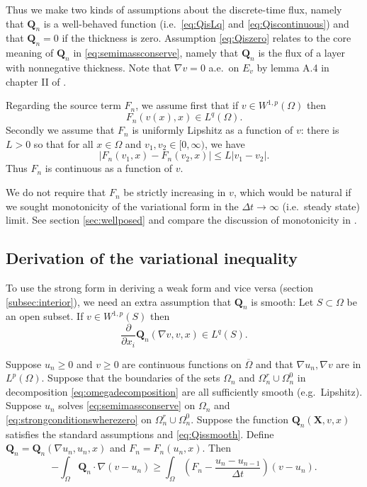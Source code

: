 \documentclass[final,leqno,onefignum,onetabnum]{siamltex1213bueler}
\newcommand\bQ{\mathbf{Q}}
\newcommand\bX{\mathbf{X}}
\renewcommand{\grad}{\nabla}
\begin{document}
Thus we make two kinds of assumptions about the discrete-time flux, namely that $\bQ_n$ is a well-behaved function (i.e.~\eqref{eq:QisLq} and \eqref{eq:Qiscontinuous}) and
that $\bQ_n=0$ if the thickness is zero.  Assumption \eqref{eq:Qiszero} relates to the core meaning of $\bQ_n$ in \eqref{eq:semimassconserve}, namely that $\bQ_n$ is the flux of a layer with nonnegative thickness.  Note that $\grad v = 0$ a.e.~on $E_v$ by lemma A.4 in chapter II of \cite{KinderlehrerStampacchia1980}.

Regarding the source term $F_n$, we assume first that if $v\in W^{1,p}(\Omega)$ then
\begin{equation}
F_n(v(x),x) \in L^q(\Omega).  \label{eq:FisLq}
\end{equation}
Secondly we assume that $F_n$ is uniformly Lipshitz as a function of $v$: there is $L>0$ so that for all $x\in\Omega$ and $v_1,v_2 \in [0,\infty)$, we have
\begin{equation}
\left|F_n(v_1,x)-F_n(v_2,x)\right| \le L |v_1-v_2|.  \label{eq:Fislip}
\end{equation}
Thus $F_n$ is continuous as a function of $v$.

We do not require that $F_n$ be strictly increasing in $v$, which would be natural if we sought monotonicity of the variational form in the $\Delta t \to \infty$ (i.e.~steady state) limit.  See section \ref{sec:wellposed} and compare the discussion of monotonicity in  \cite{JouvetBueler2012}.

\subsection{Derivation of the variational inequality}  \label{subsec:derivevi}  To use the strong form in deriving a weak form and vice versa (section \ref{subsec:interior}), we need an extra assumption that $\bQ_n$ is smooth:  Let $S \subset \Omega$ be an open subset.  If $v\in W^{1,p}(S)$ then
\begin{equation}
\frac{\partial}{\partial x_i} \bQ_n(\grad v,v,x) \in L^q(S). \label{eq:Qissmooth}
\end{equation}

\medskip
\begin{theorem} \label{thm:strongimpliesweak} Suppose $u_n\ge 0$ and $v\ge 0$ are continuous functions on $\overline{\Omega}$ and that $\grad u_n,\grad v$ are in $L^p(\Omega)$.  Suppose that the boundaries of the sets $\Omega_n$ and $\Omega_n^r \cup \Omega_n^0$ in decomposition \eqref{eq:omegadecomposition} are all sufficiently smooth (e.g.~Lipshitz).  Suppose $u_n$ solves \eqref{eq:semimassconserve} on $\Omega_n$ and \eqref{eq:strongconditionswherezero} on $\Omega_n^r \cup \Omega_n^0$.  Suppose the function $\bQ_n(\bX,v,x)$ satisfies the standard assumptions and \eqref{eq:Qissmooth}.  Define $\bQ_n=\bQ_n(\grad u_n,u_n,x)$ and $F_n = F_n(u_n,x)$.  Then
\begin{equation}
-\int_{\Omega} \bQ_n \cdot \grad(v-u_n) \ge \int_{\Omega} \left(F_n - \frac{u_n - u_{n-1}}{\Delta t}\right) (v-u_n). \label{eq:morallytheVI}
\end{equation}
\end{theorem}
\end{document}
